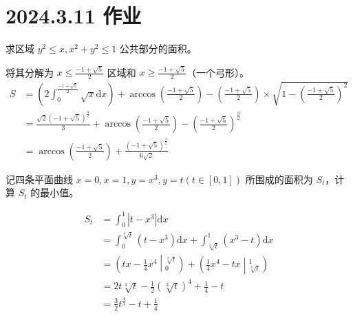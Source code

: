 \ifx\allfiles\undefined

\date{}
\author{尹锦润}

\maketitle
\fi

\section{2024.3.11 作业}

\begin{ques}
	求区域 $\displaystyle y^{2} \leqslant x,x^{2} +y^{2} \leqslant 1$ 公共部分的面积。
\end{ques}



将其分解为 $\displaystyle x\leqslant \frac{-1+\sqrt{5}}{2}$ 区域和 $\displaystyle x\geqslant \frac{-1+\sqrt{5}}{2}$（一个弓形）。
\begin{align*}
	S & =\left( 2\int _{0}^{\frac{-1+\sqrt{5}}{2}}\sqrt{x}\mathrm{d} x\right) +\arccos\left(\frac{-1+\sqrt{5}}{2}\right) -\left(\frac{-1+\sqrt{5}}{2}\right) \times \sqrt{1-\left(\frac{-1+\sqrt{5}}{2}\right)^{2}}\\
	& =\frac{\sqrt{2}\left( -1+\sqrt{5}\right)^{\frac{3}{2}}}{3} +\arccos\left(\frac{-1+\sqrt{5}}{2}\right) -\left(\frac{-1+\sqrt{5}}{2}\right)^{\frac{3}{2}}\\
	& =\arccos\left(\frac{-1+\sqrt{5}}{2}\right) +\frac{\left( -1+\sqrt{5}\right)^{\frac{3}{2}}}{6\sqrt{2}}
\end{align*}




\begin{ques}
	记四条平面曲线 $\displaystyle x=0,x=1,y=x^{3} ,y=t( t\in [ 0,1])$ 所围成的面积为 $\displaystyle S_{t}$，计算 $\displaystyle S_{t}$ 的最小值。
\end{ques}


\begin{align*}
	S_{t} & =\int _{0}^{1} |t-x^{3} |\mathrm{d} x\\
	& =\int _{0}^{\sqrt[3]{t}}\left( t-x^{3}\right)\mathrm{d} x+\int _{\sqrt[3]{t}}^{1}\left( x^{3} -t\right)\mathrm{d} x\\
	& =\left( tx-\frac{1}{4} x^{4}\middle| _{0}^{\sqrt[3]{t}}\right) +\left(\frac{1}{4} x^{4} -tx\middle| _{\sqrt[3]{t}}^{1}\right)\\
	& =2t\sqrt[3]{t} -\frac{1}{2}\left(\sqrt[3]{t}\right)^{4} +\frac{1}{4} -t\\
	& =\frac{3}{2} t^{\frac{4}{3}} -t+\frac{1}{4}
\end{align*}

